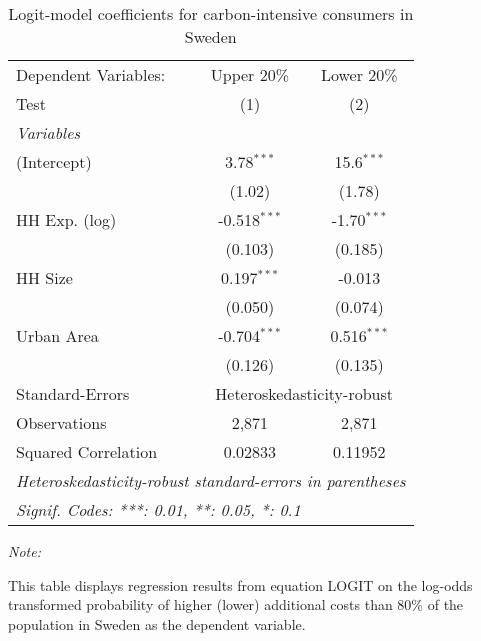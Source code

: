 
\begin{table}[htbp!]
   \centering
   \small
   \begin{adjustbox}{width = 1\textwidth, max height = 0.95\textheight, center}
      \begin{threeparttable}[b]
         \caption{\label{tab:Logit_1_SWE} Logit-model coefficients for carbon-intensive consumers in Sweden}
         \begin{tabular}{lcc}
            \tabularnewline \midrule \midrule
            Dependent Variables: & Upper 20\%     & Lower 20\%\\   
            Test                 & (1)            & (2)\\  
            \midrule
            \emph{Variables}\\
            (Intercept)          & 3.78$^{***}$   & 15.6$^{***}$\\   
                                 & (1.02)         & (1.78)\\   
            HH Exp. (log)        & -0.518$^{***}$ & -1.70$^{***}$\\   
                                 & (0.103)        & (0.185)\\   
            HH Size              & 0.197$^{***}$  & -0.013\\   
                                 & (0.050)        & (0.074)\\   
            Urban Area           & -0.704$^{***}$ & 0.516$^{***}$\\   
                                 & (0.126)        & (0.135)\\   
            \midrule 
            Standard-Errors & \multicolumn{2}{c}{Heteroskedasticity-robust} \\ 
            Observations         & 2,871          & 2,871\\  
            Squared Correlation  & 0.02833        & 0.11952\\  
            \midrule \midrule
            \multicolumn{3}{l}{\emph{Heteroskedasticity-robust standard-errors in parentheses}}\\
            \multicolumn{3}{l}{\emph{Signif. Codes: ***: 0.01, **: 0.05, *: 0.1}}\\
         \end{tabular}
         
         \begin{tablenotes}\item \medskip \textit{Note:}
            \item This table displays regression results from equation LOGIT on the log-odds transformed probability of higher (lower) additional costs than 80\% of the population in Sweden as the dependent variable. 
         \end{tablenotes}
      \end{threeparttable}
   \end{adjustbox}
\end{table}


